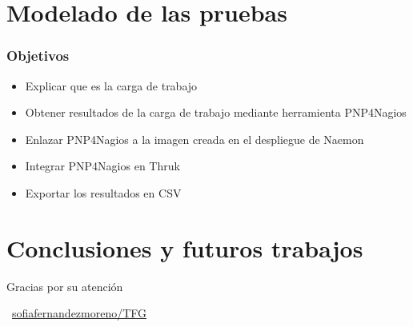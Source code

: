 \documentclass{beamer}
\theoremstyle{plain}
\theoremstyle{definition}
\theoremstyle{plain}
\theoremstyle{definition}
\theoremstyle{remark}
\theoremstyle{definition}
\begin{document}
\section{Modelado de las pruebas} %
\begin{frame}
	
	\frametitle{Objetivos}
	\begin{itemize}
		\item Explicar que es la carga de trabajo
		\item Obtener resultados de la carga de trabajo mediante herramienta PNP4Nagios
		\item Enlazar PNP4Nagios a la imagen creada en el despliegue de Naemon
		\item Integrar PNP4Nagios en Thruk
		\item Exportar los resultados en CSV			
	\end{itemize}
	
\end{frame}

\section{Conclusiones y futuros trabajos}

\begin{frame}{}{}
	\Huge{\centerline{Gracias por su atención}}
	\centerline{\Huge{\raisebox{-.25\height}\faGithub}~\large{\href{https://github.com/sofiafernandezmoreno/TFG}{\alert{sofiafernandezmoreno/TFG}}}}
	
	
	

\end{frame}
\end{document}
